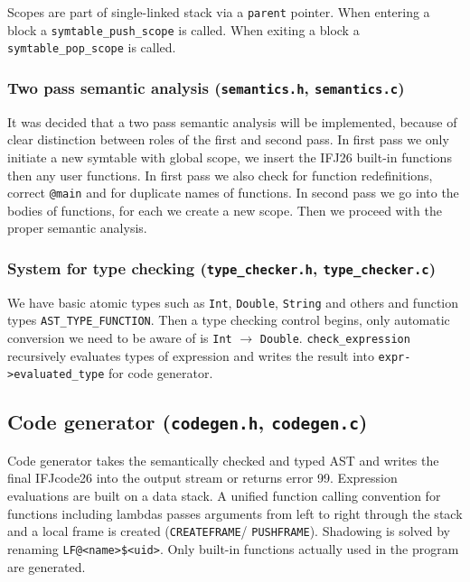 \documentclass[a4paper]{article}
\begin{document}
Scopes are part of single-linked stack via a \texttt{parent} pointer.
When entering a block a \texttt{symtable\_push\_scope} is called.
When exiting a block a \texttt{symtable\_pop\_scope} is called.

\subsubsection{Two pass semantic analysis (\texttt{semantics.h}, \texttt{semantics.c})}

It was decided that a two pass semantic analysis will be implemented, because of clear distinction between roles of the first and second pass.
In first pass we only initiate a new symtable with global scope, we insert the IFJ26 built-in functions then any user functions.
In first pass we also check for function redefinitions, correct \texttt{@main} and for duplicate names of functions.
In second pass we go into the bodies of functions, for each we create a new scope.
Then we proceed with the proper semantic analysis.

\subsubsection{System for type checking (\texttt{type\_checker.h}, \texttt{type\_checker.c})}

We have basic atomic types such as \texttt{Int}, \texttt{Double}, \texttt{String} and others and function types \texttt{AST\_TYPE\_FUNCTION}.
Then a type checking control begins, only automatic conversion we need to be aware of is \texttt{Int} $\to$ \texttt{Double}.
\texttt{check\_expression} recursively evaluates types of expression and writes the result into \texttt{expr->evaluated\_type} for code generator.

\subsection{Code generator (\texttt{codegen.h}, \texttt{codegen.c})}

Code generator takes the semantically checked and typed AST and writes the final IFJcode26 into the output stream or returns error 99.
Expression evaluations are built on a data stack.
A unified function calling convention for functions including lambdas passes arguments from left to right through the stack and a local frame is created (\texttt{CREATEFRAME}/ \texttt{PUSHFRAME}).
Shadowing is solved by renaming \texttt{LF@<name>\$<uid>}.
Only built-in functions actually used in the program are generated.
\end{document}
